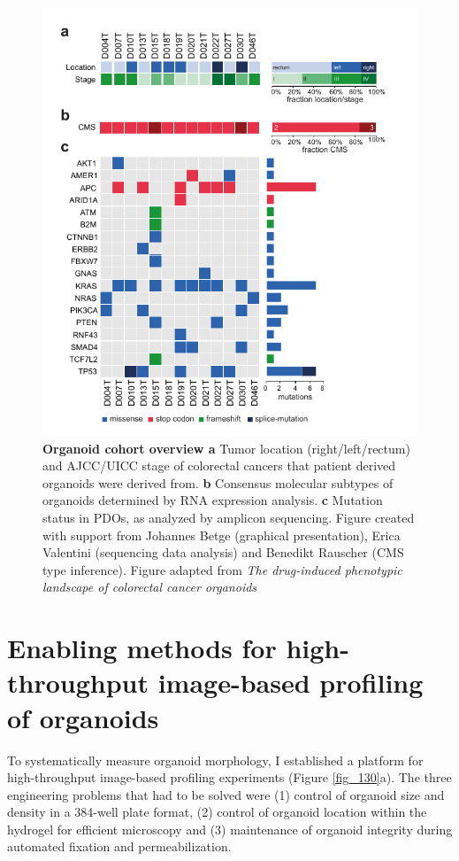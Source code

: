 \begin{flushleft}
\clearpage
\begin{figure}[h]
\centering
\includegraphics[width=\textwidth,
                height=\textheight,
                keepaspectratio]{figures/promise/pdf/fig_1_0.pdf}
\caption{\textbf{Organoid cohort overview a} Tumor location (right/left/rectum) and AJCC/UICC stage of colorectal cancers that patient derived organoids were derived from. \textbf{b}  Consensus molecular subtypes of organoids determined by RNA expression analysis. \textbf{c} Mutation status in PDOs, as analyzed by amplicon sequencing. Figure created with support from Johannes Betge (graphical presentation),  Erica Valentini (sequencing data analysis) and Benedikt Rauscher (CMS type inference). Figure adapted from \textit{The drug-induced phenotypic landscape of colorectal cancer organoids} \cite{Betge2022-kr}}
\label{fig_120}
\end{figure}
\clearpage


\section{Enabling methods for high-throughput image-based profiling of organoids}
To systematically measure organoid morphology, I established a platform for high-throughput image-based profiling experiments (Figure \ref{fig_130}a). The three engineering problems that had to be solved were (1) control of organoid size and density in a 384-well plate format, (2) control of organoid location within the hydrogel for efficient microscopy and (3) maintenance of organoid integrity during automated fixation and permeabilization. 


\end{flushleft}
